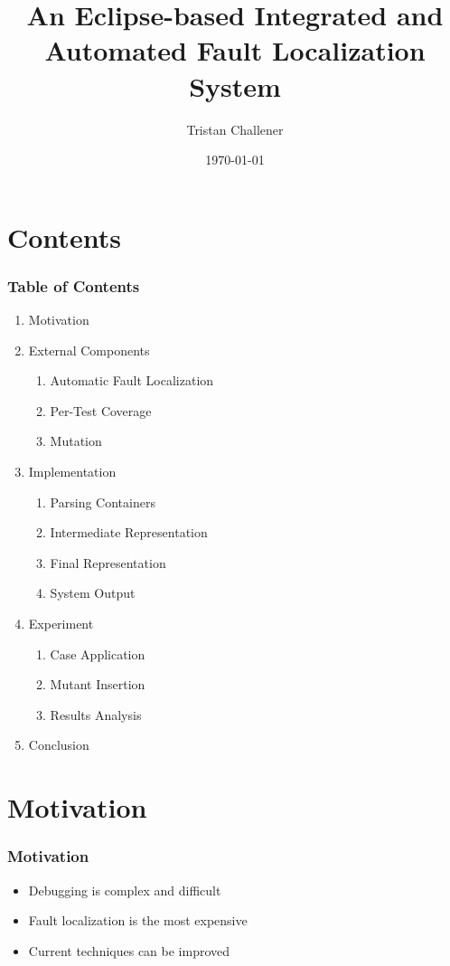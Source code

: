 \documentclass{beamer}
\title{An Eclipse-based Integrated and Automated
Fault Localization System}
\author{Tristan Challener}
\date{\today}
\begin{document}
	\begin{frame}
	\titlepage
	\end{frame}
	
	\section{Contents}
	\begin{frame}
	\frametitle{Table of Contents}
	\begin{enumerate}
	  \item Motivation
	  \item External Components
	    \begin{enumerate}
	      \item Automatic Fault Localization
	      \item Per-Test Coverage
	      \item Mutation
	    \end{enumerate}
	  \item Implementation
	    \begin{enumerate}
	      \item Parsing Containers
	      \item Intermediate Representation
	      \item Final Representation
	      \item System Output
	    \end{enumerate}
	  \item Experiment
	  	\begin{enumerate}
	  	  \item Case Application
	  	  \item Mutant Insertion
	  	  \item Results Analysis
	  	\end{enumerate}
	  \item Conclusion
	\end{enumerate}
	\end{frame}
	\section{Motivation}
	\begin{frame}
	\frametitle{Motivation}
	\begin{itemize}
	  \item Debugging is complex and difficult
	    \pause
	  \item Fault localization is the most expensive
	    \pause
	  \item Current techniques can be improved
	\end{itemize}
	\end{frame}
\end{document}
